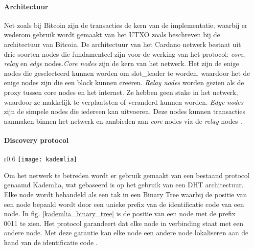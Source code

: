 \paragraph{Architectuur}
Net zoals bij Bitcoin zijn de transacties de kern van de implementatie, waarbij er wederom gebruik wordt gemaakt van het \gls{UTXO} zoals beschreven bij de architectuur van Bitcoin. 
De architectuur van het Cardano netwerk bestaat uit drie soorten \glspl{node} die fundamenteel zijn voor de werking van het protocol: \textit{core}, \textit{relay} en \textit{edge} \glspl{node}.\textit{Core \glspl{node}} zijn de kern van het netwerk. Het zijn de enige \glspl{node} die geselecteerd kunnen worden om \gls{slot_leader} te worden, waardoor het de enige \glspl{node} zijn die een block kunnen creëren.
\textit{Relay \glspl{node}} worden gezien als de proxy tussen core \glspl{node} en het internet. Ze hebben geen stake in het netwerk, waardoor ze makkelijk te verplaatsten of veranderd kunnen worden.
\textit{Edge \glspl{node}} zijn de simpele \glspl{node} die iedereen kan uitvoeren. Deze \glspl{node} kunnen transacties aanmaken binnen het netwerk en aanbieden aan \textit{core} \glspl{node} via de \textit{relay} \glspl{node} \citep[Topology]{cardano_wiki}.

\paragraph{Discovery protocol}
\begin{wrapfigure}{r}{0.6\textwidth}
  \texttt{[image: kademlia]}
  \caption{Binary Tree zoals in gebruik bij het Kademlia protocol, \cite{maymounkov2002kademlia}.}
  \label{kademlia_binary_tree}
\end{wrapfigure}

Om het netwerk te betreden wordt er gebruik gemaakt van een bestaand protocol genaamd Kademlia, wat gebaseerd is op het gebruik van een \acrfull{DHT} architectuur. Elke node wordt behandeld als een tak in een Binary Tree waarbij de positie van een \gls{node} bepaald wordt door een unieke prefix van de identificatie code van een \gls{node}. In fig. \ref{kademlia_binary_tree} is de positie van een \gls{node} met de prefix 0011 te zien. Het protocol garandeert dat elke \gls{node} in verbinding staat met een andere \gls{node}. Met deze garantie kan elke \gls{node} een andere \gls{node} lokaliseren aan de hand van de identificatie code \citep[p.~2]{maymounkov2002kademlia}.

